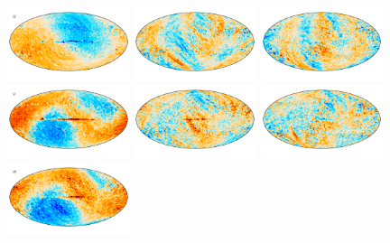 \documentclass[twocolumn]{../../common/aa}
\begin{document}
\begin{figure}
	\includegraphics[width=0.32\textwidth]{figures/megadiff_Q_I.pdf}
        \includegraphics[width=0.32\textwidth]{figures/megadiff_Q_Q.pdf}
        \includegraphics[width=0.32\textwidth]{figures/megadiff_Q_U.pdf}\\\vspace*{-4mm}
	\includegraphics[width=0.32\textwidth]{figures/megadiff_V_I.pdf}
        \includegraphics[width=0.32\textwidth]{figures/megadiff_V_Q.pdf}
        \includegraphics[width=0.32\textwidth]{figures/megadiff_V_U.pdf}\\\vspace*{-4mm}
	\includegraphics[width=0.32\textwidth]{figures/megadiff_W_I.pdf}

\end{figure}
\end{document}
